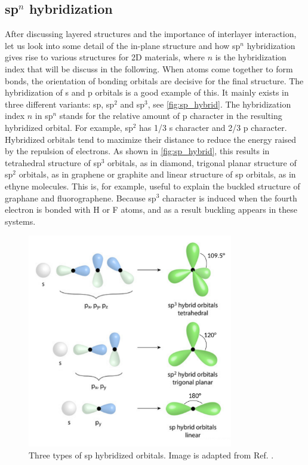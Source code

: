 \subsection{sp$^n$ hybridization\label{sphyb}}

After discussing layered structures and the importance of interlayer interaction, let us look into some detail of the in-plane structure and how sp$^n$ hybridization gives rise to various structures for 2D materials, where $n$ is the hybridization index that will be discuss in the following. When atoms come together to form bonds, the orientation of bonding orbitals are decisive for the final structure. The hybridization of s and p orbitals is a good example of this.  It mainly exists in three different variants: sp, sp$^2$ and sp$^3$, see \autoref{fig:sp_hybrid}. The hybridization index $n$ in sp$^n$ stands for the relative amount of p character in the resulting hybridized orbital. For example, sp$^2$ has 1/3 s character and 2/3 p character. Hybridized orbitals tend to maximize their distance to reduce the energy raised by the repulsion of electrons. As shown in \autoref{fig:sp_hybrid}, this results in tetrahedral structure of sp$^3$ orbitals, as in diamond, trigonal planar structure of sp$^2$ orbitals, as in graphene or graphite and linear structure of sp orbitals, as in ethyne molecules.  This is, for example, useful to explain the buckled structure of graphane and fluorographene. Because sp$^3$ character is induced when the fourth electron is bonded with H or F atoms, and as a result buckling appears in these systems. 

\begin{figure}[htb] 
\centering  
\includegraphics[width=0.8\textwidth]{sp_hybrid.png}
\caption{Three types of sp hybridized orbitals. Image is adapted from Ref. \cite{sp_hybrid}. }  
\label{fig:sp_hybrid}
\end{figure} 

